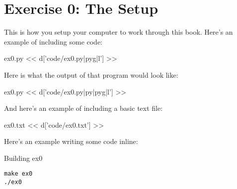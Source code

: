 \chapter{Exercise 0: The Setup}

This is how you setup your computer to work through this book.  Here's an example of including
some code:

\begin{code}{ex0.py}
<< d['code/ex0.py|pyg|l'] >>
\end{code}

Here is what the output of that program would look like:
\begin{code}{ex0.py}
<< d['code/ex0.py|py|pyg|l'] >>
\end{code}

And here's an example of including a basic text file:

\begin{code}{ex0.txt}
<< d['code/ex0.txt'] >>
\end{code}

Here's an example writing some code inline:

\begin{code}{Building ex0}
\begin{Verbatim}
make ex0
./ex0
\end{Verbatim}
\end{code}


